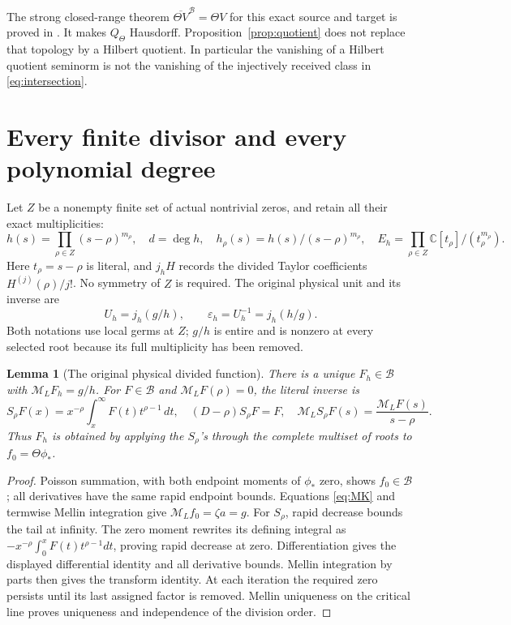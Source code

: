 \documentclass[11pt]{article}
\newtheorem{lemma}[theorem]{Lemma}
\newcommand{\C}{\mathbb C}\newcommand{\R}{\mathbb R}
\newcommand{\B}{\mathscr B}\newcommand{\HH}{\mathcal H}
\newcommand{\ML}{\mathcal M_{\!L}}\newcommand{\MR}{\mathcal M_{\!R}}
\begin{document}
The strong closed-range theorem $\overline{\Theta V}^{\B}=\Theta V$
for this exact source and target is proved in \cite{ClosedTheta}.
It makes $Q_\Theta$ Hausdorff. Proposition~\ref{prop:quotient}
does not replace that topology by a Hilbert quotient. In particular
the vanishing of a Hilbert quotient seminorm is not the vanishing
of the injectively received class in \eqref{eq:intersection}.

\section{Every finite divisor and every polynomial degree}

Let $Z$ be a nonempty finite set of actual nontrivial zeros, and
retain all their exact multiplicities:
\begin{equation}\label{eq:h}
 h(s)=\prod_{\rho\in Z}(s-\rho)^{m_\rho},\quad d=\deg h,
 \quad h_\rho(s)=h(s)/(s-\rho)^{m_\rho},\quad
 E_h=\prod_{\rho\in Z}\C[t_\rho]/(t_\rho^{m_\rho}).
\end{equation}
Here $t_\rho=s-\rho$ is literal, and $j_hH$ records the divided
Taylor coefficients $H^{(j)}(\rho)/j!$. No symmetry of $Z$ is
required. The original physical unit and its inverse are
\begin{equation}\label{eq:unit}
 U_h=j_h(g/h),\qquad \varepsilon_h=U_h^{-1}=j_h(h/g).
\end{equation}
Both notations use local germs at $Z$; $g/h$ is entire and is
nonzero at every selected root because its full multiplicity
has been removed.

\begin{lemma}[The original physical divided function]\label{lem:Fh}
There is a unique $F_h\in\B$ with $\ML F_h=g/h$.
For $F\in\B$ and $\ML F(\rho)=0$, the literal inverse is
\[
 S_\rho F(x)=x^{-\rho}\int_x^\infty F(t)t^{\rho-1}\,dt,
 \quad(D-\rho)S_\rho F=F,\quad
 \ML S_\rho F(s)=\frac{\ML F(s)}{s-\rho}.
\]
Thus $F_h$ is obtained by applying the $S_\rho$'s through
the complete multiset of roots to $f_0=\Theta\phi_*$.
\end{lemma}
\begin{proof}
Poisson summation, with both endpoint moments of $\phi_*$ zero,
shows $f_0\in\B$; all derivatives have the same rapid endpoint
bounds. Equations \eqref{eq:MK} and termwise Mellin integration
give $\ML f_0=\zeta a=g$. For $S_\rho$, rapid decrease bounds
the tail at infinity. The zero moment rewrites its defining
integral as $-x^{-\rho}\int_0^xF(t)t^{\rho-1}dt$, proving rapid
decrease at zero. Differentiation gives the displayed differential
identity and all derivative bounds. Mellin integration by parts
then gives the transform identity. At each iteration the required
zero persists until its last assigned factor is removed.
Mellin uniqueness on the critical line proves uniqueness and
independence of the division order.
\end{proof}
\end{document}
